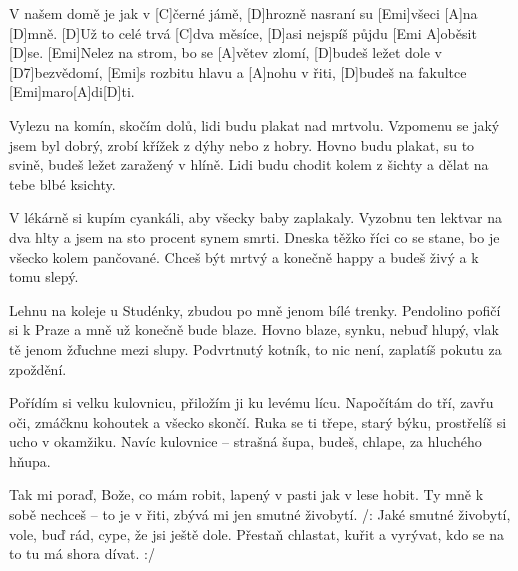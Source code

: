 
\sloka
[D]V našem domě je jak v [C]černé jámě,
[D]hrozně nasraní su [Emi]všeci [A]na [D]mně.
[D]Už to celé trvá [C]dva měsíce,
[D]asi nejspíš půjdu [Emi A]oběsit [D]se.
[Emi]Nelez na strom, bo se [A]větev zlomí,
[D]budeš ležet dole v [D7]bezvědomí,
[Emi]s rozbitu hlavu a [A]nohu v řiti,
[D]budeš na fakultce [Emi]maro[A]di[D]ti.

\sloka
Vylezu na komín, skočím dolů, lidi budu plakat nad mrtvolu.
Vzpomenu se jaký jsem byl dobrý, zrobí křížek z dýhy nebo z hobry.
Hovno budu plakat, su to svině, budeš ležet zaražený v hlíně.
Lidi budu chodit kolem z šichty a dělat na tebe blbé ksichty.

\sloka
V lékárně si kupím cyankáli, aby všecky baby zaplakaly.
Vyzobnu ten lektvar na dva hlty a jsem na sto procent synem smrti.
Dneska těžko říci co se stane, bo je všecko kolem pančované.
Chceš být mrtvý a konečně happy a budeš živý a k tomu slepý.

\sloka
Lehnu na koleje u Studénky, zbudou po mně jenom bílé trenky.
Pendolino pofičí si k Praze a mně už konečně bude blaze.
Hovno blaze, synku, nebuď hlupý, vlak tě jenom žďuchne mezi slupy.
Podvrtnutý kotník, to nic není, zaplatíš pokutu za zpoždění.

\sloka
Pořídím si velku kulovnicu, přiložím ji ku levému lícu.
Napočítám do tří, zavřu oči, zmáčknu kohoutek a všecko skončí.
Ruka se ti třepe, starý býku, prostřelíš si ucho v okamžiku.
Navíc kulovnice – strašná šupa, budeš, chlape, za hluchého hňupa.

\sloka
Tak mi poraď, Bože, co mám robit, lapený v pasti jak v lese hobit.
Ty mně k sobě nechceš – to je v řiti, zbývá mi jen smutné živobytí.
/: Jaké smutné živobytí, vole, buď rád, cype, že jsi ještě dole.
Přestaň chlastat, kuřit a vyrývat, kdo se na to tu má shora dívat. :/
